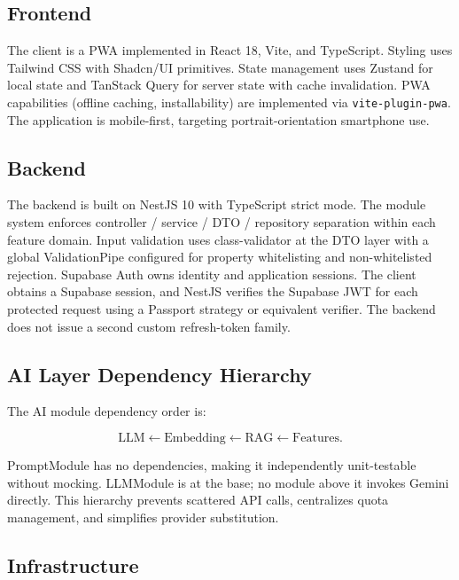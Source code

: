 \documentclass[conference]{IEEEtran}
\begin{document}
\subsection{Frontend}

The client is a PWA implemented in React 18, Vite, and TypeScript. Styling uses Tailwind CSS with Shadcn/UI primitives. State management uses Zustand for local state and TanStack Query for server state with cache invalidation. PWA capabilities (offline caching, installability) are implemented via \texttt{vite-plugin-pwa}. The application is mobile-first, targeting portrait-orientation smartphone use.

\subsection{Backend}

The backend is built on NestJS 10 with TypeScript strict mode. The module system enforces controller / service / DTO / repository separation within each feature domain. Input validation uses class-validator at the DTO layer with a global ValidationPipe configured for property whitelisting and non-whitelisted rejection. Supabase Auth owns identity and application sessions. The client obtains a Supabase session, and NestJS verifies the Supabase JWT for each protected request using a Passport strategy or equivalent verifier. The backend does not issue a second custom refresh-token family.

\subsection{AI Layer Dependency Hierarchy}

The AI module dependency order is:

\begin{equation}
\mathrm{LLM} \leftarrow \mathrm{Embedding} \leftarrow \mathrm{RAG}
\leftarrow \mathrm{Features}.
\end{equation}

PromptModule has no dependencies, making it independently unit-testable without mocking. LLMModule is at the base; no module above it invokes Gemini directly. This hierarchy prevents scattered API calls, centralizes quota management, and simplifies provider substitution.

\subsection{Infrastructure}
\end{document}
